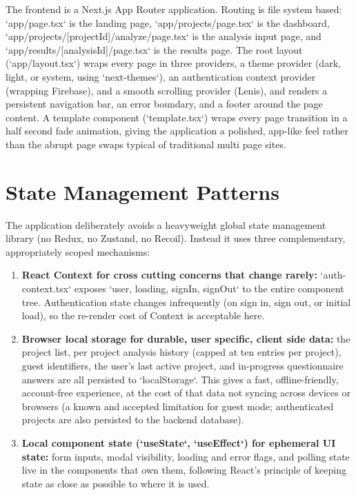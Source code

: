 \documentclass[11pt,a4paper]{report}
\begin{document}
The frontend is a Next.js App Router application. Routing is file system based: `app/page.tsx` is the landing page, `app/projects/page.tsx` is the dashboard, `app/projects/[projectId]/analyze/page.tsx` is the analysis input page, and `app/results/[analysisId]/page.tsx` is the results page. The root layout (`app/layout.tsx`) wraps every page in three providers, a theme provider (dark, light, or system, using `next-themes`), an authentication context provider (wrapping Firebase), and a smooth scrolling provider (Lenis), and renders a persistent navigation bar, an error boundary, and a footer around the page content. A template component (`template.tsx`) wraps every page transition in a half second fade animation, giving the application a polished, app-like feel rather than the abrupt page swaps typical of traditional multi page sites.

\section{State Management Patterns}

The application deliberately avoids a heavyweight global state management library (no Redux, no Zustand, no Recoil). Instead it uses three complementary, appropriately scoped mechanisms:

\begin{enumerate}[leftmargin=*]
  \item \textbf{React Context for cross cutting concerns that change rarely:} `auth-context.tsx` exposes `{user, loading, signIn, signOut}` to the entire component tree. Authentication state changes infrequently (on sign in, sign out, or initial load), so the re-render cost of Context is acceptable here.
  \item \textbf{Browser local storage for durable, user specific, client side data:} the project list, per project analysis history (capped at ten entries per project), guest identifiers, the user's last active project, and in-progress questionnaire answers are all persisted to `localStorage`. This gives a fast, offline-friendly, account-free experience, at the cost of that data not syncing across devices or browsers (a known and accepted limitation for guest mode; authenticated projects are also persisted to the backend database).
  \item \textbf{Local component state (`useState`, `useEffect`) for ephemeral UI state:} form inputs, modal visibility, loading and error flags, and polling state live in the components that own them, following React's principle of keeping state as close as possible to where it is used.
\end{enumerate}
\end{document}
